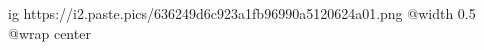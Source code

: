  
 
 
 
 

\ifcmt
  ig https://i2.paste.pics/636249d6c923a1fb96990a5120624a01.png
	@width 0.5
	@wrap center
\fi

